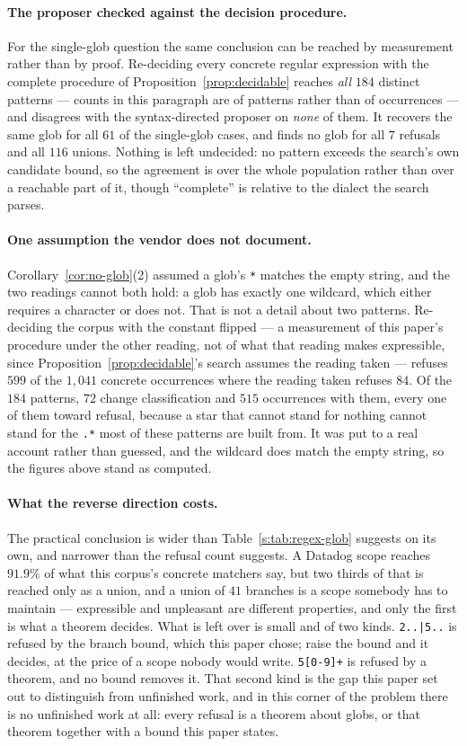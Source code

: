 \paragraph{The proposer checked against the decision procedure.}
For the single-glob question the same conclusion can be reached by measurement rather than
by proof. Re-deciding every concrete regular expression with the complete procedure of
Proposition~\ref{prop:decidable} reaches \emph{all} $184$ distinct patterns --- counts in
this paragraph are of patterns rather than of occurrences --- and disagrees with the
syntax-directed proposer on \emph{none} of them. It recovers the same glob for all $61$ of
the single-glob cases, and finds no glob for all $7$ refusals and all $116$ unions.
Nothing is left undecided: no pattern exceeds the search's own candidate bound, so the
agreement is over the whole population rather than over a reachable part of it, though
``complete'' is relative to the dialect the search parses.

\paragraph{One assumption the vendor does not document.}
Corollary~\ref{cor:no-glob}(2) assumed a glob's \texttt{*} matches the empty string, and
the two readings cannot both hold: a glob has exactly one wildcard, which either requires
a character or does not. That is not a detail about two patterns. Re-deciding the corpus
with the constant flipped --- a measurement of this paper's procedure under the other
reading, not of what that reading makes expressible, since
Proposition~\ref{prop:decidable}'s search assumes the reading taken --- refuses $599$ of
the $1{,}041$ concrete occurrences where the reading taken refuses $84$. Of the $184$
patterns, $72$ change classification and $515$ occurrences with them, every one of them
toward refusal, because a star that cannot stand for nothing cannot stand for the
\texttt{.*} most of these patterns are built from. It was put to a real account rather than
guessed, and the wildcard does match the empty string, so the figures above stand as
computed.

\paragraph{What the reverse direction costs.}
The practical conclusion is wider than Table~\ref{s:tab:regex-glob} suggests on its own,
and narrower than the refusal count suggests. A Datadog scope reaches $91.9\%$ of what
this corpus's concrete matchers say, but two thirds of that is reached only as a union, and
a union of $41$ branches is a scope somebody has to maintain --- expressible and unpleasant
are different properties, and only the first is what a theorem decides. What is left over
is small and of two kinds. \texttt{2..|5..} is refused by the branch bound, which this
paper chose; raise the bound and it decides, at the price of a scope nobody would write.
\texttt{5[0-9]+} is refused by a theorem, and no bound removes it. That second kind is the
gap this paper set out to distinguish from unfinished work, and in this corner of the
problem there is no unfinished work at all: every refusal is a theorem about globs, or that
theorem together with a bound this paper states.
